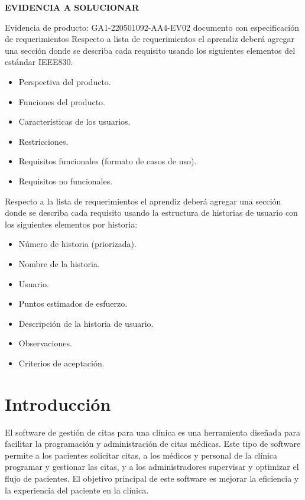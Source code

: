 \documentclass{article}
\theoremstyle{mytheoremstyle}
\theoremstyle{mytheoremstyle}
\theoremstyle{myproblemstyle}
\begin{document}
\begin{flushleft}
    \large \textbf{EVIDENCIA A SOLUCIONAR}\\
    \vspace{1cm}
    
    \large Evidencia de producto: GA1-220501092-AA4-EV02 documento con especificación de requerimientos
    Respecto a lista de requerimientos el aprendiz deberá agregar una sección donde se describa cada requisito usando los siguientes elementos del estándar IEEE830.
    \begin{itemize}
    \item Perspectiva del producto.
    \item Funciones del producto.
    \item Características de los usuarios.
    \item Restricciones.
    \item Requisitos funcionales (formato de casos de uso).
    \item Requisitos no funcionales.
    \end{itemize}
    Respecto a la lista de requerimientos el aprendiz deberá agregar una sección donde se describa cada requisito usando la estructura de historias de usuario con los siguientes elementos por historia:
    \begin{itemize}
    \item Número de historia (priorizada).
    \item Nombre de la historia.
    \item Usuario.
    \item Puntos estimados de esfuerzo.
    \item Descripción de la historia de usuario.
    \item Observaciones.
    \item Criterios de aceptación.
    \end{itemize}
    \end{flushleft}
    \newpage


\section{Introducción}
\large El software de gestión de citas para una clínica es una herramienta diseñada para facilitar la programación y administración de citas médicas. Este tipo de software permite a los pacientes solicitar citas, a los médicos y personal de la clínica programar y gestionar las citas, y a los administradores supervisar y optimizar el flujo de pacientes. El objetivo principal de este software es mejorar la eficiencia y la experiencia del paciente en la clínica.
\end{document}
